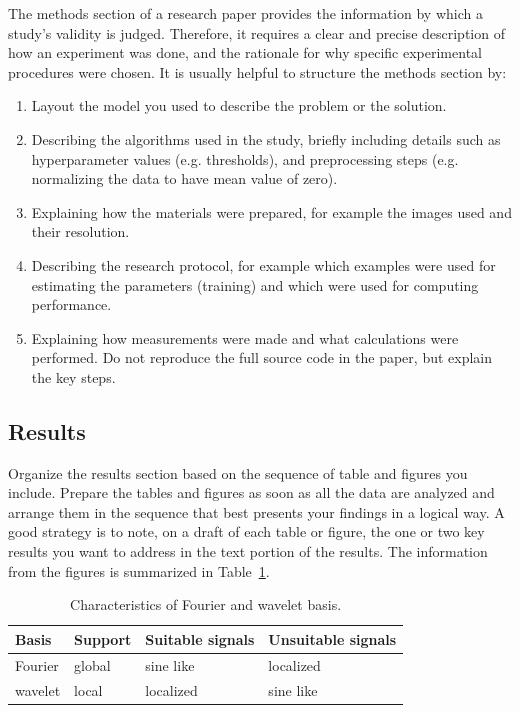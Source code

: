 \documentclass[10pt,conference,compsocconf]{IEEEtran}
\begin{document}
The methods section of a research paper provides the information by
which a study's validity is judged.
Therefore, it requires a clear and precise description of how an
experiment was done, and the rationale
for why specific experimental procedures were chosen.
It is usually helpful to
structure the methods section by:
\begin{enumerate}
\item Layout the model you used to describe the problem or the solution.
\item Describing the algorithms used in the study, briefly including
  details such as hyperparameter values (e.g. thresholds), and
  preprocessing steps (e.g. normalizing the data to have mean value of
  zero).
\item Explaining how the materials were prepared, for example the
  images used and their resolution.
\item Describing the research protocol, for example which examples
  were used for estimating the parameters (training) and which were
  used for computing performance.
\item Explaining how measurements were made and what
  calculations were performed. Do not reproduce the full source code in
  the paper, but explain the key steps.
\end{enumerate}

\subsection{Results}

Organize the results section based on the sequence of table and
figures you include. Prepare the tables and figures as soon as all
the data are analyzed and arrange them in the sequence that best
presents your findings in a logical way. A good strategy is to note,
on a draft of each table or figure, the one or two key results you
want to address in the text portion of the results.
The information from the figures is
summarized in Table~\ref{tab:fourier-wavelet}.

\begin{table}[htbp]
  \centering
  \begin{tabular}[c]{|l||l|l|l|}
    \hline
    Basis&Support&Suitable signals&Unsuitable signals\\
    \hline
    Fourier&global&sine like&localized\\
    wavelet&local&localized&sine like\\
    \hline
  \end{tabular}
  \caption{Characteristics of Fourier and wavelet basis.}
  \label{tab:fourier-wavelet}
\end{table}
\end{document}
